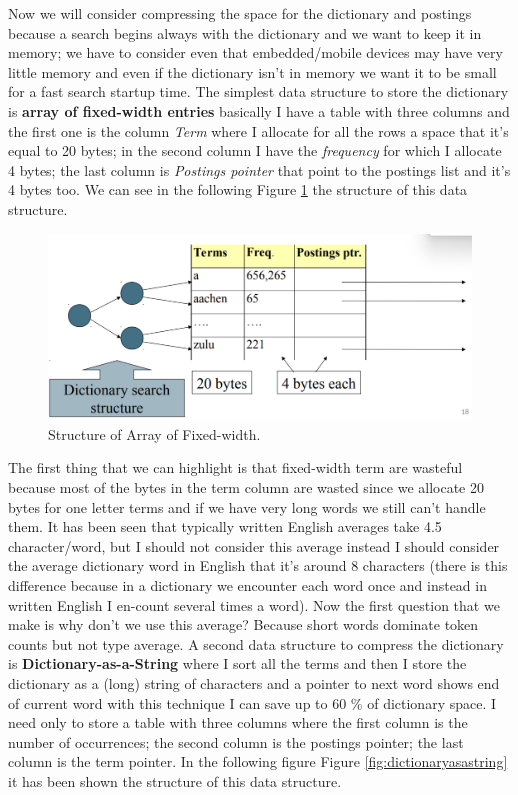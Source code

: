 Now we will consider compressing the space for the dictionary and postings because a search begins always with the dictionary and we want to keep it in memory; we have to consider even that embedded/mobile devices may have very little memory and even if the dictionary isn't in memory we want it to be small for a fast search startup time.\newline
The simplest data structure to store the dictionary is \textbf{array of fixed-width entries} basically I have a table with three columns and the first one is the column \textit{Term} where I allocate for all the rows a space that it's equal to 20 bytes; in the second column I have the \textit{frequency} for which I allocate 4 bytes; the last column is \textit{Postings pointer} that point to the postings list and it's 4 bytes too. We can see in the following Figure \ref{fig:arrayfixedwidth} the structure of this data structure.\newline
\begin{figure}
    \centering
    \includegraphics[width=0.75\linewidth]{images/arrayfixedwidth.png}
    \caption{Structure of Array of Fixed-width.}
    \label{fig:arrayfixedwidth}
\end{figure}
The first thing that we can highlight is that fixed-width term are wasteful because most of the bytes in the term column are wasted since we allocate 20 bytes for one letter terms and if we have very long words we still can't handle them. It has been seen that typically written English averages take 4.5 character/word, but I should not consider this average instead I should consider the average dictionary word in English that it's around 8 characters (there is this difference because in a dictionary we encounter each word once and instead in written English I en-count several times a word). Now the first question that we make is why don't we use this average? Because short words dominate token counts but not type average.\newline
A second data structure to compress the dictionary is \textbf{Dictionary-as-a-String} where I sort all the terms and then I store the dictionary as a (long) string of characters and a pointer to next word shows end of current word with this technique I can save up to 60 \% of dictionary space. I need only to store a table with three columns where the first column is the number of occurrences; the second column is the postings pointer; the last column is the term pointer. In the following figure Figure \ref{fig:dictionaryasastring} it has been shown the structure of this data structure.\newline
